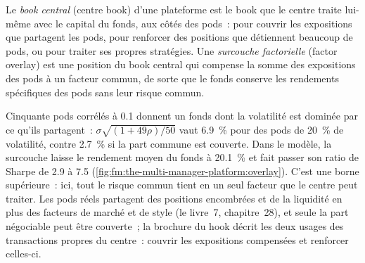\begin{definition}\label{def:fm:the-multi-manager-platform:centre}
Le \emph{book central} (centre book) d'une plateforme est le book que le centre traite lui-même avec le capital du fonds, aux côtés des pods~: pour couvrir
les expositions que partagent les pods, pour renforcer des positions que détiennent beaucoup de pods, ou pour traiter ses propres stratégies. Une \emph{surcouche factorielle} (factor overlay) est une
position du book central qui compense la somme des expositions des pods à un facteur commun, de sorte que le fonds conserve les rendements spécifiques des pods sans
leur risque commun.
\end{definition}

Cinquante pods corrélés à 0.1 donnent un fonds dont la volatilité est dominée par ce qu'ils partagent~: $\sigma\sqrt{(1+49\rho)/50}$ vaut 6.9~\% pour des pods de 20~\%
de volatilité, contre 2.7~\% si la part commune est couverte. Dans le modèle, la surcouche laisse le rendement moyen du fonds à 20.1~\% et fait passer son ratio de Sharpe
de 2.9 à 7.5 (\cref{fig:fm:the-multi-manager-platform:overlay}). C'est une borne supérieure~: ici, tout le risque commun tient en un seul facteur que le
centre peut traiter. Les pods réels partagent des positions encombrées et de la liquidité en plus des facteurs de marché et de style (le livre~7, chapitre~28), et seule
la part négociable peut être couverte~; la brochure du hook décrit les deux usages des transactions propres du centre~: couvrir les expositions compensées et renforcer
celles-ci.

\begin{omfigure}

\label{fig:fm:the-multi-manager-platform:overlay}
\end{omfigure}

